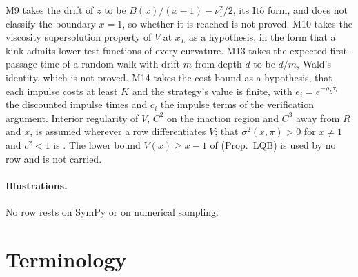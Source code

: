 M9 takes the drift of $z$ to be $B(x)/(x-1)-\nu_1^2/2$, its Itô form, and
does not classify the boundary $x=1$, so whether it is reached is not proved.
M10 takes the viscosity supersolution property of $V$ at $x_L$ as a
hypothesis, in the form that a kink admits lower test functions of every
curvature. M13 takes the expected first-passage time of a random walk with
drift $m$ from depth $d$ to be $d/m$, Wald's identity, which is not proved.
M14 takes the cost bound as a hypothesis, that each impulse costs at least
$K$ and the strategy's value is finite, with $e_i=e^{-\rho_L\tau_i}$ the
discounted impulse times and $c_i$ the impulse terms of the verification
argument. Interior regularity of $V$, $C^2$ on the inaction region and $C^3$
away from $R$ and $\bar x$, is assumed wherever a row differentiates $V$;
that $\sigma^2(x,\pi)>0$ for $x\ne1$ and $c^2<1$ is
. The lower bound $V(x)\ge x-1$ of
 (Prop.~LQB) is used by no row and is not carried.

\paragraph{Illustrations.} No row rests on SymPy or on numerical sampling.

\section{Terminology}
\label{app:terms}

